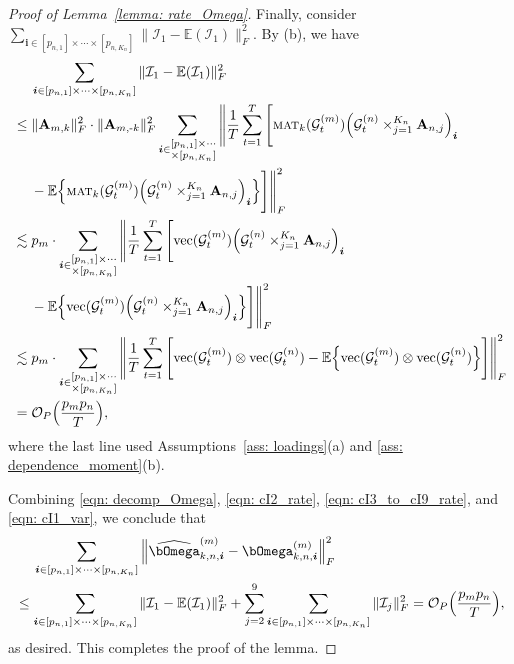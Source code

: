 \documentclass[aos]{imsart}
\theoremstyle{plain}
\theoremstyle{definition}
\def\mat{\textnormal{\textsc{mat}}}
\def\wh#1{\widehat{#1}}
\def\E{\mathbb{E}}
\def\cG{\mathcal{G}} \def\cH{\boldsymbol{\mathcal{H}}} \def\cI{\mathcal{I}}
\def\cO{\mathcal{O}}
\def\bi{\boldsymbol{i}}
\def\bA{\mathbf{A}}
\def\vec{\mathrm{vec}}
\begin{document}
\begin{proof}[Proof of Lemma~\ref{lemma: rate_Omega}]
Finally, consider $\sum_{\bi \in [p_{n,1}] \times \cdots \times[p_{n,K_n}]} \|\cI_1 - \E(\cI_1)\|_F^2$. By (b), we have
\begin{align}
    &\;\quad
    \sum_{\bi \in [p_{n,1}] \times \cdots \times[p_{n,K_n}]} \|\cI_1 - \E(\cI_1)\|_F^2 \notag \\
    &\leq
    \|\bA_{m,k}\|_F^2 \cdot \|\bA_{m,\text{-}k}\|_F^2
    \sum_{\bi \in \substack{[p_{n,1}] \times \cdots\\ \times[p_{n,K_n}] }} \Bigg\| \frac{1}{T} \sum_{t=1}^T \Bigg[ \mat_k(\cG_t^{(m)}) \Big( \cG_t^{(n)} \times_{j=1}^{K_n} \bA_{n,j} \Big)_{\bi} \notag \\
    &\;\quad
    - \E\Big\{ \mat_k(\cG_t^{(m)}) \Big( \cG_t^{(n)} \times_{j=1}^{K_n} \bA_{n,j} \Big)_{\bi} \Big\} \Bigg] \Bigg\|_F^2 \notag \\
    &\lesssim
    p_m \cdot \sum_{\bi \in \substack{[p_{n,1}] \times \cdots\\ \times[p_{n,K_n}] }} \Bigg\| \frac{1}{T} \sum_{t=1}^T \Bigg[ \vec(\cG_t^{(m)}) \Big( \cG_t^{(n)} \times_{j=1}^{K_n} \bA_{n,j} \Big)_{\bi} \notag \\
    &\;\quad
    - \E\Big\{ \vec(\cG_t^{(m)}) \Big( \cG_t^{(n)} \times_{j=1}^{K_n} \bA_{n,j} \Big)_{\bi} \Big\} \Bigg] \Bigg\|_F^2 \notag \\
    &\lesssim
    p_m \cdot \sum_{\bi \in \substack{[p_{n,1}] \times \cdots\\ \times[p_{n,K_n}] }} \Bigg\| \frac{1}{T} \sum_{t=1}^T \Bigg[ \vec(\cG_t^{(m)}) \otimes \vec(\cG_t^{(n)}) - \E\Big\{ \vec(\cG_t^{(m)}) \otimes \vec(\cG_t^{(n)}) \Big\} \Bigg] \Bigg\|_F^2 \notag \\
    &=
    \cO_P\Big( \frac{p_m p_n}{T} \Big) ,
    \label{eqn: cI1_var}
\end{align}
where the last line used Assumptions~\ref{ass: loadings}(a) and \ref{ass: dependence_moment}(b).

Combining \eqref{eqn: decomp_Omega}, \eqref{eqn: cI2_rate}, \eqref{eqn: cI3_to_cI9_rate}, and \eqref{eqn: cI1_var}, we conclude that
\begin{align*}
    &\;\quad
    \sum_{\bi \in [p_{n,1}] \times \cdots \times[p_{n,K_n}]} \Big\| \wh\bOmega_{k,n,\bi}^{(m)} - \bOmega_{k,n,\bi}^{(m)} \Big\|_F^2 \\
    &\leq
    \sum_{\bi \in [p_{n,1}] \times \cdots \times[p_{n,K_n}]} \|\cI_1 - \E(\cI_1)\|_F^2 + \sum_{j=2}^9 \sum_{\bi \in [p_{n,1}] \times \cdots \times[p_{n,K_n}]} \|\cI_j\|_F^2 = \cO_P\Big( \frac{p_m p_n}{T} \Big) ,
\end{align*}
as desired. This completes the proof of the lemma.
\end{proof}
\end{document}
